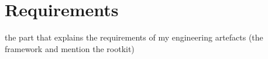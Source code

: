 \chapter{Requirements}

the part that explains the requirements of my engineering artefacts (the framework and mention the rootkit)